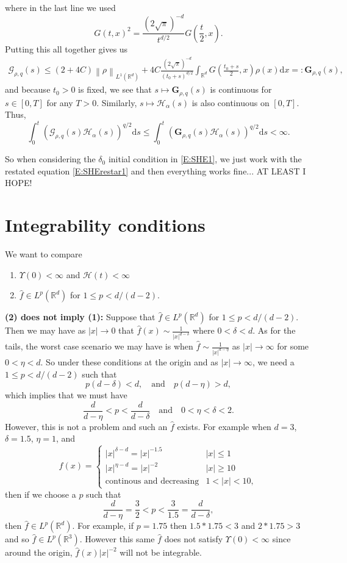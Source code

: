 \documentclass{article}
\numberwithin{equation}{section}
\newcommand{\R}{\mathbb{R}}
\newcommand{\Norm}[1]{\left\|  #1   \right\|}
\newcommand{\ud}{\ensuremath{\mathrm{d}}}
\begin{document}
where in the last line we used
	\[
		G(t,x)^2 = \frac{(2\sqrt{\pi})^{-d}}{t^{d/2}} G\left(\frac{t}{2}, x\right).
	\]
Putting this all together gives us
	\begin{align*}
		\mathcal{G}_{\rho, q}(s) \le (2+4C)\Norm{\rho}_{L^1(\R^d)} + 4C\frac{(2\sqrt{\pi})^{-d}}{(t_0 + s)^{d/2}} \int_{\R^d} G\left(\frac{t_0 + s}{2}, x\right) \rho(x) \ud x =: \textbf{G}_{\rho, q}(s),
	\end{align*}
and because $t_0>0$ is fixed, we see that $s \mapsto \textbf{G}_{\rho, q}(s)$ is continuous for $s \in [0, T]$ for any $T>0$. Similarly, $s \mapsto \mathcal{H}_\alpha(s)$ is also continuous on $[0,T]$. Thus,
	\begin{equation}
		\int_0^t \left(\mathcal{G}_{\rho, q}(s) \mathcal{H}_{\alpha}(s)\right)^{q/2} \ud s \le 	\int_0^t \left(\textbf{G}_{\rho, q}(s) \mathcal{H}_{\alpha}(s)\right)^{q/2} \ud s < \infty.
	\end{equation}

So when considering the $\delta_0$ initial condition in \eqref{E:SHE1}, we just work with the restated equation \eqref{E:SHErestar1} and then everything works fine... AT LEAST I HOPE!


\section{Integrability conditions}
We want to compare
\begin{enumerate}
	\item $\Upsilon(0) < \infty$ and $\mathcal{H}(t) <\infty$
	\item $\hat{f} \in L^p(\R^d)$ for $1 \le p < d/(d-2)$.
\end{enumerate}

\textbf{(2) does not imply (1):} Suppose that $\hat{f} \in L^p(\R^d)$ for $1 \le p < d/(d-2)$. Then  we may have as $|x| \to 0$ that $\hat{f}(x) \sim \frac{1}{|x|^{d - \delta}}$ where $0 < \delta < d$. As for the tails, the worst case scenario we may have is when $\hat{f} \sim \frac{1}{|x|^{d - \eta}}$ as $|x| \to \infty$ for some $0<\eta<d$. So under these conditions at the origin and as $|x| \to \infty$, we need a $1 \le p < d/(d-2)$ such that
	\[
		p(d-\delta) <d, \quad \text{and} \quad p(d - \eta)>d,
	\]
which implies that we must have
	\[
		\frac{d}{d-\eta} < p < \frac{d}{d - \delta} \quad \text{and} \quad 0 < \eta < \delta < 2.
	\]
However, this is not a problem and such an $\hat{f}$ exists. For example when $d=3$, $\delta = 1.5$, $\eta = 1$, and
	\[
		f(x) = \begin{cases}
					|x|^{\delta - d} = |x|^{-1.5} & |x| \le 1 \\
					|x|^{\eta -d} = |x|^{-2} & |x| \ge 10 \\
					\text{continous and decreasing} & 1 < |x| < 10,
				\end{cases}
	\]
then if we choose a $p$ such that
	\[
		\frac{d}{d-\eta} = \frac{3}{2} < p < \frac{3}{1.5} = \frac{d}{d-\delta},
	\]
then $\hat{f} \in L^p(\R^d)$. For example, if $p=1.75$ then $1.5*1.75 < 3$ and $2 * 1.75 > 3$ and so $\hat{f} \in L^p(\R^3)$. However this same $\hat{f}$ does not satisfy $\Upsilon(0) < \infty$ since around the origin, $\hat{f}(x)|x|^{-2}$ will not be integrable.
\end{document}
